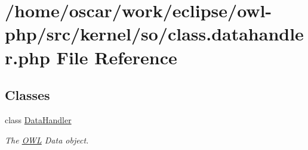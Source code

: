 \hypertarget{class_8datahandler_8php}{
\section{/home/oscar/work/eclipse/owl-php/src/kernel/so/class.datahandler.php File Reference}
\label{class_8datahandler_8php}
}
\subsection*{Classes}
\begin{CompactItemize}
\item 
class \hyperlink{classDataHandler}{DataHandler}
\begin{CompactList}\small\item\em The \hyperlink{classOWL}{OWL} Data object. \item\end{CompactList}\end{CompactItemize}
